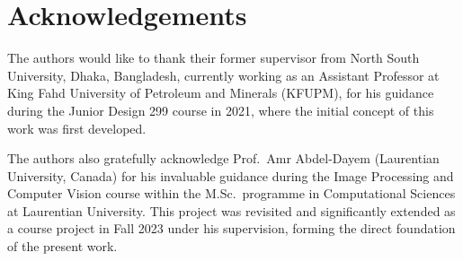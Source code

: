\documentclass[10pt,twocolumn]{article}
\begin{document}
\section*{Acknowledgements}
The authors would like to thank their former supervisor from North South University, Dhaka, Bangladesh, currently working as an Assistant Professor at King Fahd University of Petroleum and Minerals (KFUPM), for his guidance during the Junior Design 299 course in 2021, where the initial concept of this work was first developed.

The authors also gratefully acknowledge Prof.\ Amr Abdel-Dayem (Laurentian University, Canada) for his invaluable guidance during the Image Processing and Computer Vision course within the M.Sc.\ programme in Computational Sciences at Laurentian University. This project was revisited and significantly extended as a course project in Fall 2023 under his supervision, forming the direct foundation of the present work.
\end{document}
